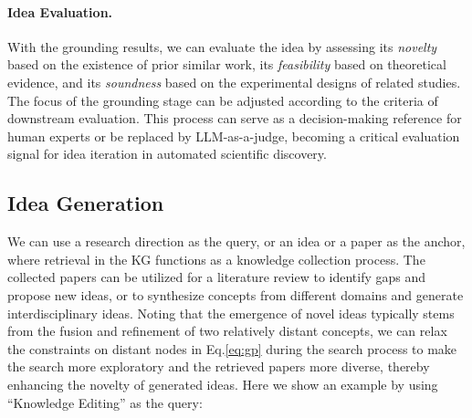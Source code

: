\paragraph{Idea Evaluation.}
With the grounding results, we can evaluate the idea by assessing its \textit{novelty} based on the existence of prior similar work, its \textit{feasibility} based on theoretical evidence, and its \textit{soundness} based on the experimental designs of related studies.
The focus of the grounding stage can be adjusted according to the criteria of downstream evaluation.
This process can serve as a decision-making reference for human experts or be replaced by LLM-as-a-judge, becoming a critical evaluation signal for idea iteration in automated scientific discovery.

\subsection{Idea Generation}
We can use a research direction as the query, or an idea or a paper as the anchor, where retrieval in the KG functions as a knowledge collection process.
The collected papers can be utilized for a literature review to identify gaps and propose new ideas, or to synthesize concepts from different domains and generate interdisciplinary ideas.
Noting that the emergence of novel ideas typically stems from the fusion and refinement of two relatively distant concepts, we can relax the constraints on distant nodes in Eq.\ref{eq:gp} during the search process to make the search more exploratory and the retrieved papers more diverse, thereby enhancing the novelty of generated ideas.
Here we show an example by using ``Knowledge Editing'' as the query:
